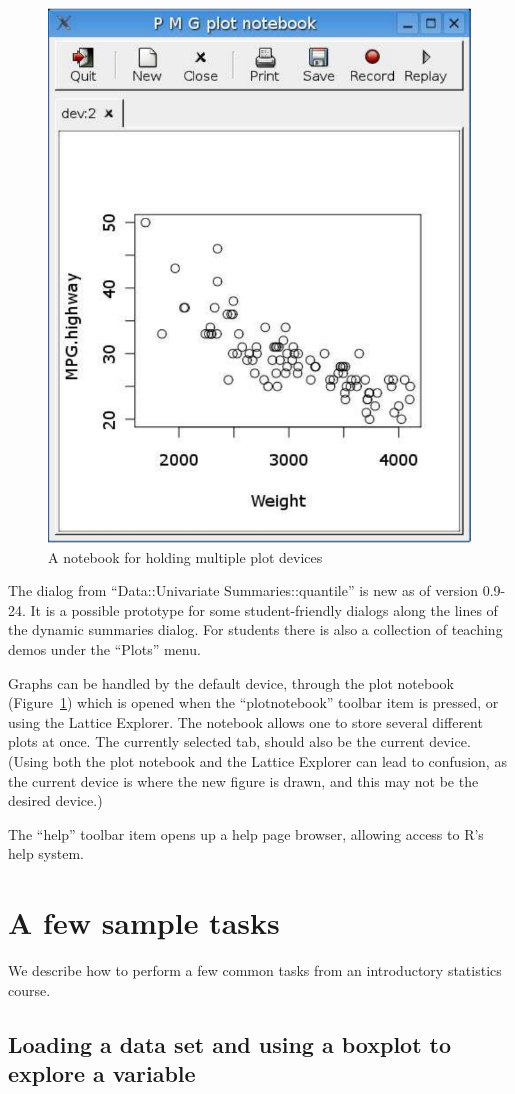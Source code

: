 \documentclass[12pt]{article}
\begin{document}
\begin{figure}[htb]
  \centering
  \includegraphics[width=.5\textwidth]{pmg-plotnotebook}
  \caption{A notebook for holding multiple plot devices}
  \label{fig:pmg-gui-plotnotebook-dialog}
\end{figure}



The dialog from ``Data::Univariate Summaries::quantile'' is new as of
version 0.9-24. It is a possible prototype for some student-friendly
dialogs along the lines of the dynamic summaries dialog. For students
there is also a collection of teaching demos under the ``Plots''
menu. 

Graphs can be handled by the default device, through the plot notebook
(Figure~\ref{fig:pmg-gui-plotnotebook-dialog}) which is opened when
the ``plotnotebook'' toolbar item is pressed, or using the Lattice
Explorer. The notebook allows one to store several different plots at
once. The currently selected tab, should also be the current device.
(Using both the plot notebook and the Lattice Explorer can lead to
confusion, as the current device is where the new figure is drawn, and
this may not be the desired device.)

The ``help'' toolbar item opens up a help page browser, allowing
access to R's help system. 


\section{A few sample tasks}

We describe how to perform a few common tasks from an introductory
statistics course.

\subsection{Loading a data set and using a boxplot to explore a
  variable}
\end{document}
